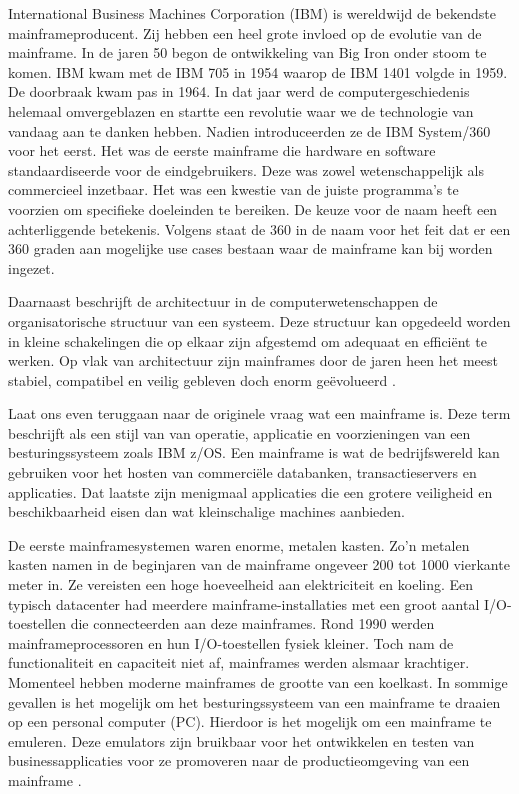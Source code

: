 International Business Machines Corporation (IBM) is wereldwijd de bekendste mainframeproducent. Zij hebben een heel grote invloed op de evolutie van de mainframe. In de jaren 50 begon de ontwikkeling van Big Iron onder stoom te komen. IBM kwam met de IBM 705 in 1954 waarop de IBM 1401 volgde in 1959. De doorbraak kwam pas in 1964. In dat jaar werd de computergeschiedenis helemaal omvergeblazen en startte een revolutie waar we de technologie van vandaag aan te danken hebben. Nadien introduceerden ze de IBM System/360 voor het eerst. Het was de eerste mainframe die hardware en software standaardiseerde voor de eindgebruikers. Deze was zowel wetenschappelijk als commercieel inzetbaar. Het was een kwestie van de juiste programma's te voorzien om specifieke doeleinden te bereiken. De keuze voor de naam heeft een achterliggende betekenis. Volgens \textcite{Ebbers2022} staat de 360 in de naam voor het feit dat er een 360 graden aan mogelijke use cases bestaan waar de mainframe kan bij worden ingezet. 

Daarnaast beschrijft de architectuur in de computerwetenschappen de organisatorische structuur van een systeem. Deze structuur kan opgedeeld worden in kleine schakelingen die op elkaar zijn afgestemd om adequaat en efficiënt te werken. Op vlak van architectuur zijn mainframes door de jaren heen het meest stabiel, compatibel en veilig gebleven doch enorm geëvolueerd \autocite{Ebbers2022}. 



Laat ons even teruggaan naar de originele vraag wat een mainframe is. Deze term beschrijft \textcite{Ebbers2022} als een stijl van van operatie, applicatie en voorzieningen van een besturingssysteem zoals IBM z/OS. Een mainframe is wat de bedrijfswereld kan gebruiken voor het hosten van commerciële databanken, transactieservers en applicaties. Dat laatste zijn menigmaal applicaties die een grotere veiligheid en beschikbaarheid eisen dan wat kleinschalige machines aanbieden. 

De eerste mainframesystemen waren enorme, metalen kasten. Zo'n metalen kasten namen in de beginjaren van de mainframe ongeveer 200 tot 1000 vierkante meter in. Ze vereisten een hoge hoeveelheid aan elektriciteit en koeling. Een typisch datacenter had meerdere mainframe-installaties met een groot aantal I/O-toestellen die connecteerden aan deze mainframes. Rond 1990 werden mainframeprocessoren en hun I/O-toestellen fysiek kleiner. Toch nam de functionaliteit en capaciteit niet af, mainframes werden alsmaar krachtiger. Momenteel hebben moderne mainframes de grootte van een koelkast. In sommige gevallen is het mogelijk om het besturingssysteem van een mainframe te draaien op een personal computer (PC). Hierdoor is het mogelijk om een mainframe te emuleren. Deze emulators zijn bruikbaar voor het ontwikkelen en testen van businessapplicaties voor ze promoveren naar de productieomgeving van een mainframe  \autocite{Ebbers2022}. 

